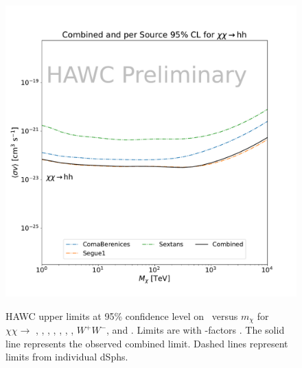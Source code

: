 \begin{figure}[h]
{    \includegraphics[scale=0.21]{figures/mtd_hawc_dm/results/Combined95_New_duck_hh_.pdf}
    }
    \caption{HAWC upper limits at 95\% confidence level on \sv~versus $m_\chi$ for $\chi\chi \rightarrow $ , , , , , , , $W^+ W^-$, and . Limits are with \LS \J-factors \cite{DM_Strigari20}. The solid line represents the observed combined limit. Dashed lines represent limits from individual dSphs.}
\label{fig:mtd_limits_1of2}
\end{figure}

